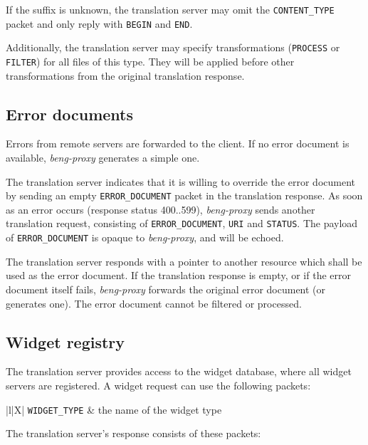\documentclass[a4paper,12pt]{article}
\begin{document}
If the suffix is unknown, the translation server may omit the
\verb|CONTENT_TYPE| packet and only reply with \verb|BEGIN| and
\verb|END|.

Additionally, the translation server may specify transformations
(\verb|PROCESS| or \verb|FILTER|) for all files of this type.  They
will be applied before other transformations from the original
translation response.

\subsection{Error documents}
\label{errdoc}

Errors from remote servers are forwarded to the client.  If no error
document is available, \emph{beng-proxy} generates a simple one.

The translation server indicates that it is willing to override the
error document by sending an empty \verb|ERROR_DOCUMENT| packet in
the translation response.  As soon as an error occurs (response status
400..599), \emph{beng-proxy} sends another translation request,
consisting of \verb|ERROR_DOCUMENT|, \verb|URI| and
\verb|STATUS|.  The payload of \verb|ERROR_DOCUMENT| is opaque to
\emph{beng-proxy}, and will be echoed.

The translation server responds with a pointer to another resource
which shall be used as the error document.  If the translation
response is empty, or if the error document itself fails,
\emph{beng-proxy} forwards the original error document (or generates
one).  The error document cannot be filtered or processed.

\subsection{Widget registry}
\label{registry}

The translation server provides access to the widget database, where
all widget servers are registered.  A widget request can use the
following packets:

\begin{longtabu*}{|l|X|}
\hline
\verb|WIDGET_TYPE| & the name of the widget type \\
\hline
\end{longtabu*}

The translation server's response consists of these packets:
\end{document}
